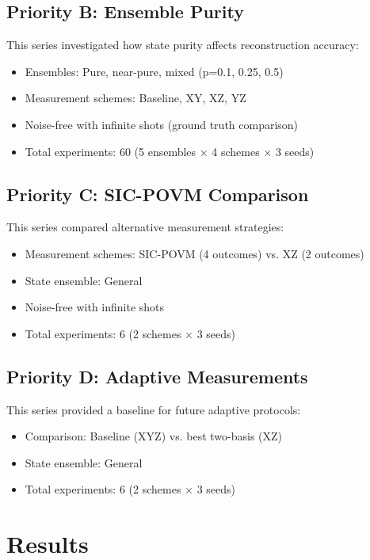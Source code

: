 \documentclass[conference]{IEEEtran}
\begin{document}
\subsection{Priority B: Ensemble Purity}

This series investigated how state purity affects reconstruction accuracy:
\begin{itemize}
    \item Ensembles: Pure, near-pure, mixed (p=0.1, 0.25, 0.5)
    \item Measurement schemes: Baseline, XY, XZ, YZ
    \item Noise-free with infinite shots (ground truth comparison)
    \item Total experiments: 60 (5 ensembles × 4 schemes × 3 seeds)
\end{itemize}

\subsection{Priority C: SIC-POVM Comparison}

This series compared alternative measurement strategies:
\begin{itemize}
    \item Measurement schemes: SIC-POVM (4 outcomes) vs. XZ (2 outcomes)
    \item State ensemble: General
    \item Noise-free with infinite shots
    \item Total experiments: 6 (2 schemes × 3 seeds)
\end{itemize}

\subsection{Priority D: Adaptive Measurements}

This series provided a baseline for future adaptive protocols:
\begin{itemize}
    \item Comparison: Baseline (XYZ) vs. best two-basis (XZ)
    \item State ensemble: General
    \item Total experiments: 6 (2 schemes × 3 seeds)
\end{itemize}

\section{Results}
\end{document}
